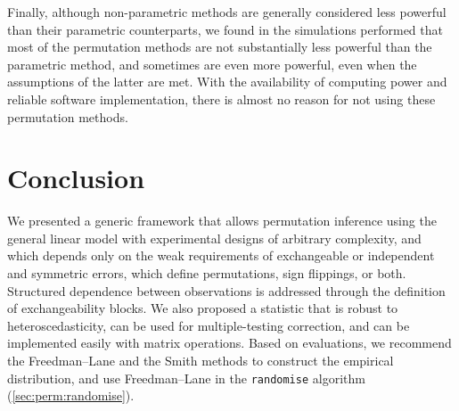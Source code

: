 Finally, although non-parametric methods are generally considered less powerful than their parametric counterparts, we found in the simulations performed that most of the permutation methods are not substantially less powerful than the parametric method, and sometimes are even more powerful, even when the assumptions of the latter are met. With the availability of computing power and reliable software implementation, there is almost no reason for not using these permutation methods.

\section{Conclusion}

We presented a generic framework that allows permutation inference using the general linear model with experimental designs of arbitrary complexity, and which depends only on the weak requirements of exchangeable or independent and symmetric errors, which define permutations, sign flippings, or both. Structured dependence between observations is addressed through the definition of exchangeability blocks. We also proposed a statistic that is robust to heteroscedasticity, can be used for multiple-testing correction, and can be implemented easily with matrix operations. Based on evaluations, we recommend the Freedman--Lane and the Smith methods to construct the empirical distribution, and use Freedman--Lane in the \texttt{randomise} algorithm (\ref{sec:perm:randomise}).
